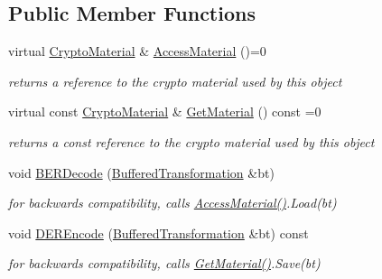 \subsection*{Public Member Functions}
\begin{DoxyCompactItemize}
\item 
\hypertarget{class_asymmetric_algorithm_ad99d55413166b69a0a12e10d111926c8}{
virtual \hyperlink{class_crypto_material}{CryptoMaterial} \& \hyperlink{class_asymmetric_algorithm_ad99d55413166b69a0a12e10d111926c8}{AccessMaterial} ()=0}
\label{class_asymmetric_algorithm_ad99d55413166b69a0a12e10d111926c8}

\begin{DoxyCompactList}\small\item\em returns a reference to the crypto material used by this object \item\end{DoxyCompactList}\item 
\hypertarget{class_asymmetric_algorithm_adf9cc798c5a2d20ab3436dbad8e6df2d}{
virtual const \hyperlink{class_crypto_material}{CryptoMaterial} \& \hyperlink{class_asymmetric_algorithm_adf9cc798c5a2d20ab3436dbad8e6df2d}{GetMaterial} () const =0}
\label{class_asymmetric_algorithm_adf9cc798c5a2d20ab3436dbad8e6df2d}

\begin{DoxyCompactList}\small\item\em returns a const reference to the crypto material used by this object \item\end{DoxyCompactList}\item 
\hypertarget{class_asymmetric_algorithm_a522dbfcd5c1a46bf1be301cec26d6534}{
void \hyperlink{class_asymmetric_algorithm_a522dbfcd5c1a46bf1be301cec26d6534}{BERDecode} (\hyperlink{class_buffered_transformation}{BufferedTransformation} \&bt)}
\label{class_asymmetric_algorithm_a522dbfcd5c1a46bf1be301cec26d6534}

\begin{DoxyCompactList}\small\item\em for backwards compatibility, calls \hyperlink{class_asymmetric_algorithm_ad99d55413166b69a0a12e10d111926c8}{AccessMaterial()}.Load(bt) \item\end{DoxyCompactList}\item 
\hypertarget{class_asymmetric_algorithm_a2d704079890783422b0a44653480ab83}{
void \hyperlink{class_asymmetric_algorithm_a2d704079890783422b0a44653480ab83}{DEREncode} (\hyperlink{class_buffered_transformation}{BufferedTransformation} \&bt) const }
\label{class_asymmetric_algorithm_a2d704079890783422b0a44653480ab83}

\begin{DoxyCompactList}\small\item\em for backwards compatibility, calls \hyperlink{class_asymmetric_algorithm_adf9cc798c5a2d20ab3436dbad8e6df2d}{GetMaterial()}.Save(bt) \item\end{DoxyCompactList}\end{DoxyCompactItemize}


